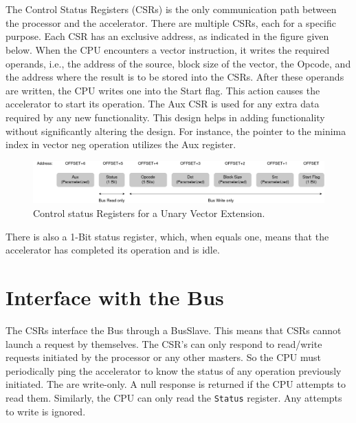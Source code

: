 \begin{paper}
\renewcommand*{\pagemark}{}
\section*{}
The Control Status Registers (CSRs) is the only communication path between the processor and the accelerator. There are multiple CSRs, each for a specific purpose. Each CSR has an exclusive address, as indicated in the figure given below. When the CPU encounters a vector instruction, it writes the required operands, i.e., the address of the source, block size of the vector, the Opcode, and the address where the result is to be stored into the CSRs. After these operands are written, the CPU writes one into the Start flag. This action causes the accelerator to start its operation. The Aux CSR is used for any extra data required by any new functionality. This design helps in adding functionality without significantly altering the design. For instance, the pointer to the minima index in vector neg operation utilizes the Aux register.\\
\begin{figure}[H]
\centering
\includegraphics[width=\textwidth]{Images/VectorExtensions-CSRUniary(1).png}
\caption{\content Control status Registers for a Unary Vector Extension.}
\end{figure}

\noindent There is also a 1-Bit status register, which, when equals one, means that the accelerator has completed its operation and is idle.
\section*{Interface with the Bus\sdot}
The CSRs interface the Bus through a BusSlave. This means that CSRs cannot launch a request by themselves. The CSR's can only respond to read/write requests initiated by the processor or any other masters. So the CPU must periodically ping the accelerator to know the status of any operation previously initiated. The  are write-only. A null response is returned if the CPU attempts to read them. Similarly, the CPU can only read the \texttt{Status} register. Any attempts to write is ignored.

\end{paper}